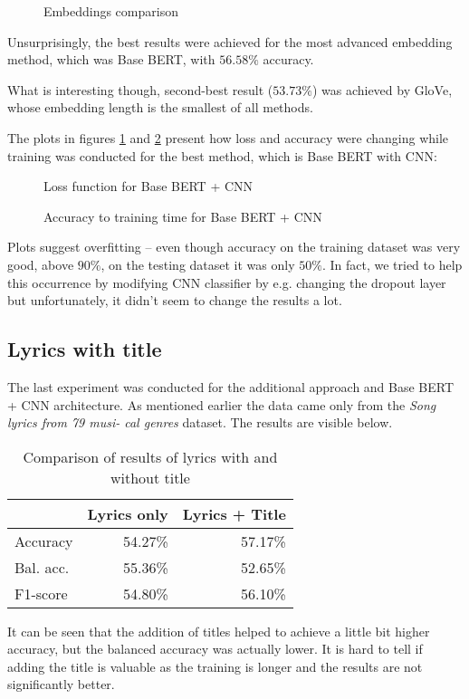 \begin{figure}[!h]
\centering

\caption{Embeddings comparison}
\end{figure}

Unsurprisingly, the best results were achieved for the most advanced embedding method, which was Base BERT, with $56.58\%$ accuracy.

What is interesting though, second-best result ($53.73\%$) was achieved by GloVe, whose embedding length is the smallest of all methods.

The plots in figures \ref{loss} and \ref{accuracy} present how loss and accuracy were changing while training was conducted for the best method, which is Base BERT with CNN:

\begin{figure}[!h]
\centering

\caption{Loss function for Base BERT + CNN}
\label{loss}
\end{figure} 

\begin{figure}[!h]
\centering

\caption{Accuracy to training time for Base BERT + CNN}
\label{accuracy}
\end{figure}

Plots suggest overfitting -- even though accuracy on the training dataset was very good, above $90\%$, on the testing dataset it was only $50\%$. In fact, we tried to help this occurrence by modifying CNN classifier by e.g. changing the dropout layer but unfortunately, it didn't seem to change the results a lot.

\subsection{Lyrics with title}
The last experiment was conducted for the additional approach and Base BERT + CNN architecture. As mentioned earlier the data came only from the \textit{Song lyrics from 79 musi-
cal genres} dataset. The results are visible below.


\begin{table}[!h]
\centering
\begin{tabular}{l|r|r}
  & \textbf{Lyrics only} & \textbf{Lyrics + Title} \\\hline
Accuracy  & 54.27\% & 57.17\%   \\
Bal. acc. & 55.36\% & 52.65\%  \\
F1-score  & 54.80\% & 56.10\%      
\end{tabular}
\caption{Comparison of results of lyrics with and without title}
\end{table}

It can be seen that the addition of titles helped to achieve a little bit higher accuracy, but the balanced accuracy was actually lower. It is hard to tell if adding the title is valuable as the training is longer and the results are not significantly better.
